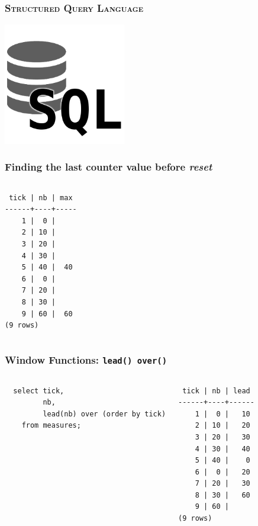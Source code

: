 \documentclass{beamer}
\begin{document}
\begin{frame}
  \frametitle{\textsc{Structured Query Language}}

  \begin{center}
    \includegraphics[height=2.1in]{sql.png}
  \end{center}
\end{frame}


\begin{frame}[fragile]
  \frametitle{Finding the last counter value before \textit{reset}}

\begin{columns}
\begin{verbatim}
 tick | nb | max 
------+----+-----
    1 |  0 |    
    2 | 10 |    
    3 | 20 |    
    4 | 30 |    
    5 | 40 |  40
    6 |  0 |    
    7 | 20 |    
    8 | 30 |    
    9 | 60 |  60
(9 rows)
\end{verbatim}
\end{columns}
\end{frame}

\begin{frame}[fragile]
  \frametitle{Window Functions: \texttt{lead() over()}}

\begin{columns}
\begin{verbatim}
  select tick,
         nb,
         lead(nb) over (order by tick)
    from measures;
\end{verbatim}

\begin{verbatim}
 tick | nb | lead 
------+----+------
    1 |  0 |   10
    2 | 10 |   20
    3 | 20 |   30
    4 | 30 |   40
    5 | 40 |    0
    6 |  0 |   20
    7 | 20 |   30
    8 | 30 |   60
    9 | 60 |     
(9 rows)
\end{verbatim}
\end{columns}
\end{frame}
\end{document}
